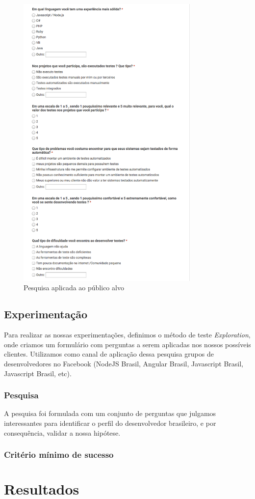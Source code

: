 \begin{figure}
  \centering
  \includegraphics[width=0.8\textwidth]{imagens/survey.png}
  \caption{Pesquisa aplicada ao público alvo}
  \label{fig:LABEL_FIG_4}
\end{figure}

\subsection{Experimentação}

Para realizar as nossas experimentações, definimos o método de teste \emph{Exploration}, onde criamos um formulário com perguntas a serem aplicadas nos nossos possíveis clientes. Utilizamos como canal de aplicação dessa pesquisa grupos de desenvolvedores no Facebook (NodeJS Brasil, Angular Brasil, Javascript Brasil, Javascript Brasil, etc).

\subsubsection{Pesquisa}
A pesquisa foi formulada com um conjunto de perguntas que julgamos interessantes para identificar o perfil do desenvolvedor brasileiro, e por consequência, validar a nossa hipótese.

\subsubsection{Critério mínimo de sucesso}


\section {Resultados}

